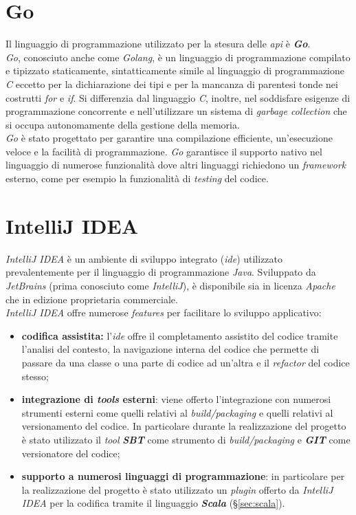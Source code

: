 \section{Go}\label{sec:go}
Il linguaggio di programmazione utilizzato per la stesura delle \textit{\gls{api}} è \textbf{\textit{Go}}.\\
\textit{Go}, conosciuto anche come \textit{Golang}, è un linguaggio di programmazione compilato e tipizzato staticamente, sintatticamente simile al linguaggio di programmazione \textit{C} eccetto per la dichiarazione dei tipi e per la mancanza di parentesi tonde nei costrutti \textit{for} e \textit{if}. Si differenzia dal linguaggio \textit{C}, inoltre, nel soddisfare esigenze di programmazione concorrente e nell'utilizzare un sistema di \textit{garbage collection} che si occupa autonomamente della gestione della memoria.\\
\textit{Go} è stato progettato per garantire una compilazione efficiente, un'esecuzione veloce e la facilità di programmazione.
\textit{Go} garantisce il supporto nativo nel linguaggio di numerose funzionalità dove altri linguaggi richiedono un \textit{\textit{\gls{framework}}} esterno, come per esempio la funzionalità di \textit{testing} del codice.

\section{IntelliJ IDEA}
\textit{IntelliJ IDEA} è un ambiente di sviluppo integrato (\textit{\gls{ide}}) utilizzato prevalentemente per il linguaggio di programmazione \textit{Java}. Sviluppato da \textit{JetBrains} (prima conosciuto come \textit{IntelliJ}), è disponibile sia in licenza \textit{Apache} che in edizione proprietaria commerciale.\\
\textit{IntelliJ IDEA} offre numerose \textit{features} per facilitare lo sviluppo applicativo:
\begin{itemize}
	\item{\textbf{codifica assistita:} l'\textit{\gls{ide}} offre il completamento assistito del codice tramite l'analisi del contesto, la navigazione interna del codice che permette di passare da una classe o una parte di codice ad un'altra e il \textit{refactor} del codice stesso;}
	\item{\textbf{integrazione di \textit{tools} esterni}: viene offerto l'integrazione con numerosi strumenti esterni come quelli relativi al \textit{build/packaging} e quelli relativi al versionamento del codice. In particolare durante la realizzazione del progetto è stato utilizzato il \textit{tool} \textbf{\textit{SBT}} come strumento di \textit{build/packaging} e \textbf{\textit{GIT}} come versionatore del codice;}
	\item{\textbf{supporto a numerosi linguaggi di programmazione}: in particolare per la realizzazione del progetto è stato utilizzato un \textit{plugin} offerto da \textit{IntelliJ IDEA} per la codifica tramite il linguaggio \textbf{\textit{Scala}} (\S\ref{sec:scala}).}
\end{itemize}

